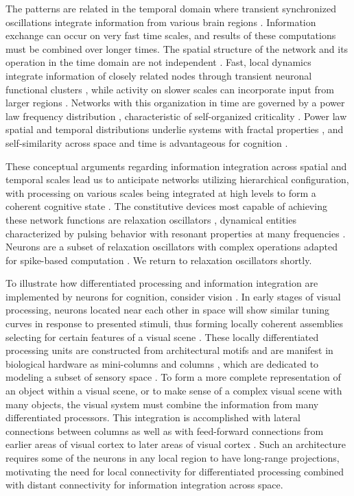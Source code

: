 \documentclass[twocolumn]{article}
\begin{document}
The patterns are related in the temporal domain where transient synchronized oscillations integrate information from various brain regions \cite{vala2001,sase2001,enfr2001}. Information exchange can occur on very fast time scales, and results of these computations must be combined over longer times. The spatial structure of the network and its operation in the time domain are not independent \cite{spto2000,spto2002,waxu2006}. Fast, local dynamics integrate information of closely related nodes through transient neuronal functional clusters \cite{buwa2012}, while activity on slower scales can incorporate input from larger regions \cite{stsa2000}. Networks with this organization in time are governed by a power law frequency distribution \cite{bata1987,budr2004,bu2006}, characteristic of self-organized criticality \cite{be2007}. Power law spatial and temporal distributions underlie systems with fractal properties \cite{bata1987,bu2006}, and self-similarity across space and time is advantageous for cognition \cite{bu2006,be2007,kism2009,shya2009,ch2010,rusp2011}. 

These conceptual arguments regarding information integration across spatial and temporal scales lead us to anticipate networks utilizing hierarchical configuration, with processing on various scales being integrated at high levels to form a coherent cognitive state \cite{brto2006}. The constitutive devices most capable of achieving these network functions are relaxation oscillators \cite{bu2006,st2015}, dynamical entities characterized by pulsing behavior \cite{mist1990} with resonant properties at many frequencies \cite{soko1993,huya2000}. Neurons are a subset of relaxation oscillators with complex operations adapted for spike-based computation \cite{geki2002}. We return to relaxation oscillators shortly.

To illustrate how differentiated processing and information integration are implemented by neurons for cognition, consider vision \cite{laus2011}. In early stages of visual processing, neurons located near each other in space will show similar tuning curves \cite{daab2001} in response to presented stimuli, thus forming locally coherent assemblies selecting for certain features of a visual scene \cite{enfr2001}. These locally differentiated processing units are constructed from architectural motifs \cite{spko2004,onsa2005} and are manifest in biological hardware as mini-columns and columns \cite{mo1997}, which are dedicated to modeling a subset of sensory space \cite{haah2017}. To form a more complete representation of an object within a visual scene, or to make sense of a complex visual scene with many objects, the visual system must combine the information from many differentiated processors. This integration is accomplished with lateral connections between columns \cite{spto2000} as well as with feed-forward connections from earlier areas of visual cortex to later areas of visual cortex \cite{laus2011}. Such an architecture requires some of the neurons in any local region to have long-range projections, motivating the need for local connectivity for differentiated processing combined with distant connectivity for information integration across space. 
\end{document}
